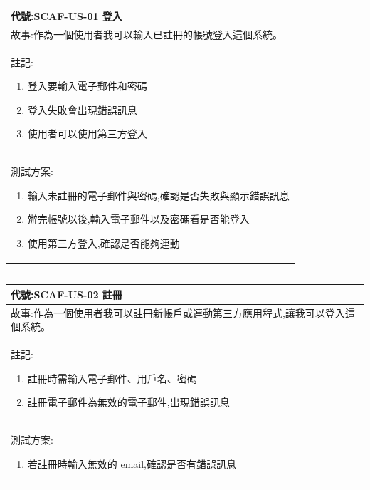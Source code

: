 \documentclass{report}
\begin{document}
\subsection*{}
\fontsize{12}{20}\selectfont
\begin{tabularx}{\textwidth}{|X|}
  \hline
  代號:SCAF-US-01 登入\\ \hline
  故事:作為一個使用者我可以輸入已註冊的帳號登入這個系統。 \\ \hline
  註記:
  \begin{enumerate}
    \item 登入要輸入電子郵件和密碼
    \item 登入失敗會出現錯誤訊息
    \item 使用者可以使用第三方登入 
  \end{enumerate} \\ \hline
  測試方案:
  \begin{enumerate}
    \item 輸入未註冊的電子郵件與密碼,確認是否失敗與顯示錯誤訊息
    \item 辦完帳號以後,輸入電子郵件以及密碼看是否能登入
    \item 使用第三方登入,確認是否能夠連動
  \end{enumerate} \\ \hline
\end{tabularx}

\subsection*{}
\fontsize{12}{20}\selectfont
\begin{tabularx}{\textwidth}{|X|}
  \hline
  代號:SCAF-US-02 註冊 \\ \hline
  故事:作為一個使用者我可以註冊新帳戶或連動第三方應用程式,讓我可以登入這個系統。 \\ \hline
  註記:
  \begin{enumerate}
    \item 註冊時需輸入電子郵件、用戶名、密碼
    \item 註冊電子郵件為無效的電子郵件,出現錯誤訊息
  \end{enumerate} \\ \hline
  測試方案:
  \begin{enumerate}
    \item 若註冊時輸入無效的 email,確認是否有錯誤訊息
  \end{enumerate} \\ \hline
\end{tabularx}
\end{document}

